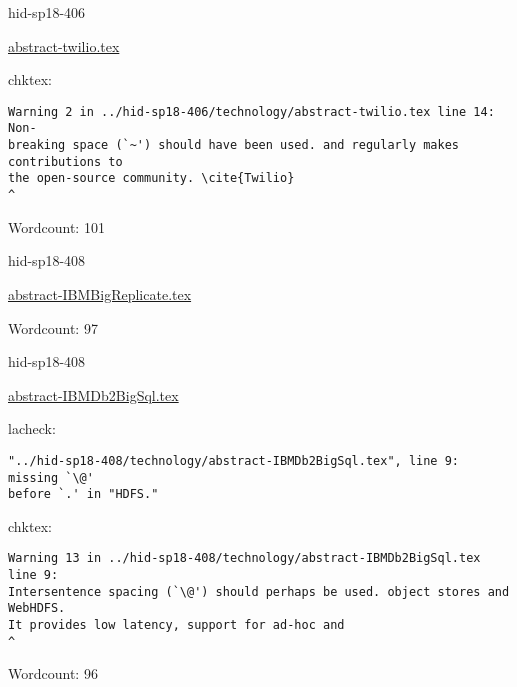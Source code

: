 

\begin{IU}

hid-sp18-406

\href{https://github.com/cloudmesh-community/hid-sp18-406/blob/master//technology/abstract-twilio.tex}{abstract-twilio.tex}

 
chktex:
\begin{tiny}
\begin{verbatim}
Warning 2 in ../hid-sp18-406/technology/abstract-twilio.tex line 14: Non-
breaking space (`~') should have been used. and regularly makes contributions to
the open-source community. \cite{Twilio}
^
\end{verbatim}
\end{tiny}

Wordcount: 101

\end{IU}



\begin{IU}

hid-sp18-408

\href{https://github.com/cloudmesh-community/hid-sp18-408/blob/master//technology/abstract-IBMBigReplicate.tex}{abstract-IBMBigReplicate.tex}

 

Wordcount: 97

\end{IU}



\begin{IU}

hid-sp18-408

\href{https://github.com/cloudmesh-community/hid-sp18-408/blob/master//technology/abstract-IBMDb2BigSql.tex}{abstract-IBMDb2BigSql.tex}

 
lacheck:
\begin{tiny}
\begin{verbatim}
"../hid-sp18-408/technology/abstract-IBMDb2BigSql.tex", line 9: missing `\@'
before `.' in "HDFS."
\end{verbatim}
\end{tiny}
chktex:
\begin{tiny}
\begin{verbatim}
Warning 13 in ../hid-sp18-408/technology/abstract-IBMDb2BigSql.tex line 9:
Intersentence spacing (`\@') should perhaps be used. object stores and WebHDFS.
It provides low latency, support for ad-hoc and                             ^
\end{verbatim}
\end{tiny}

Wordcount: 96

\end{IU}

